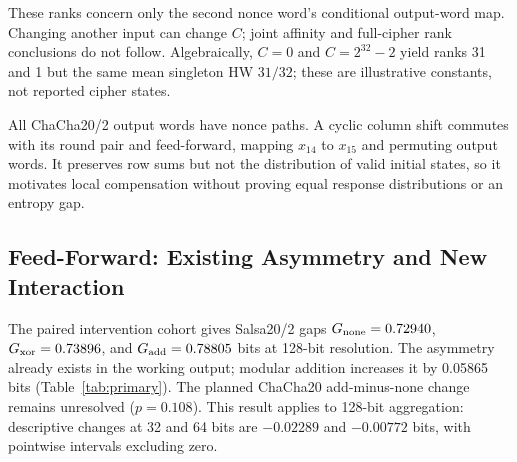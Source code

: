 \documentclass[electronics,article,submit,pdftex,oneauthor]{Definitions/mdpi}
\begin{document}
These ranks concern only the second nonce word's conditional output-word map. Changing another input can change $C$; joint affinity and full-cipher rank conclusions do not follow. Algebraically, $C=0$ and $C=2^{32}-2$ yield ranks 31 and 1 but the same mean singleton HW $31/32$; these are illustrative constants, not reported cipher states.

All ChaCha20/2 output words have nonce paths. A cyclic column shift commutes with its round pair and feed-forward, mapping $x_{14}$ to $x_{15}$ and permuting output words. It preserves row sums but not the distribution of valid initial states, so it motivates local compensation without proving equal response distributions or an entropy gap.


\subsection{Feed-Forward: Existing Asymmetry and New Interaction}\label{sec:ffresults}

The paired intervention cohort gives Salsa20/2 gaps $G_{\rm none}=0.72940$, $G_{\rm xor}=0.73896$, and $G_{\rm add}=0.78805$ bits at 128-bit resolution. The asymmetry already exists in the working output; modular addition increases it by 0.05865 bits (Table~\ref{tab:primary}). The planned ChaCha20 add-minus-none change remains unresolved ($p=0.108$). This result applies to 128-bit aggregation: descriptive changes at 32 and 64 bits are $-0.02289$ and $-0.00772$ bits, with pointwise intervals excluding zero.
\end{document}
